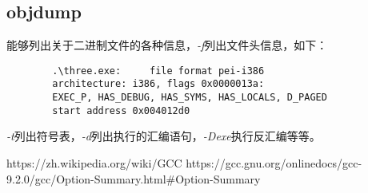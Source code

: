 \documentclass[UTF8]{ctexart}
\begin{document}
    \subsection{objdump}
    能够列出关于二进制文件的各种信息，\emph{-f}列出文件头信息，如下：
    \begin{verbatim}
        .\three.exe:     file format pei-i386
        architecture: i386, flags 0x0000013a:
        EXEC_P, HAS_DEBUG, HAS_SYMS, HAS_LOCALS, D_PAGED
        start address 0x004012d0
    \end{verbatim}
    \emph{-t}列出符号表，\emph{-d}列出执行的汇编语句，\emph{-Dexe}执行反汇编等等。
    \begin{thebibliography}{99}
         https://zh.wikipedia.org/wiki/GCC
         https://gcc.gnu.org/onlinedocs/gcc-9.2.0/gcc/Option-Summary.html\#Option-Summary
    \end{thebibliography}
    \appendix
\end{document}
